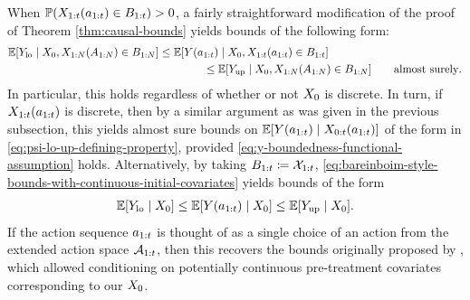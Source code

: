 





When $\mathbb{P}(X_{1:t}(a_{1:t}) \in B_{1:t}) > 0$, a fairly straightforward modification of the proof of Theorem \ref{thm:causal-bounds} yields bounds of the following form:
\begin{align}
    \mathbb{E}[Y_{\mathrm{lo}} \mid X_0, X_{1:N}(A_{1:N}) \in B_{1:N}] 
        &\leq \mathbb{E}[Y(a_{1:t}) \mid X_0, X_{1:t}(a_{1:t}) \in B_{1:t}] \notag \\
        &\qquad\qquad\leq \mathbb{E}[Y_{\mathrm{up}} \mid X_0, X_{1:N}(A_{1:N}) \in B_{1:N}] \qquad \text{almost surely}. \label{eq:bareinboim-style-bounds-with-continuous-initial-covariates}
\end{align}
In particular, this holds regardless of whether or not $X_0$ is discrete.
In turn, if $X_{1:t}(a_{1:t})$ is discrete, then by a similar argument as was given in the previous subsection, this yields almost sure bounds on $\mathbb{E}[Y(a_{1:t}) \mid X_{0:t}(a_{1:t})]$ of the form in \eqref{eq:psi-lo-up-defining-property}, provided \eqref{eq:y-boundedness-functional-assumption} holds.
Alternatively, by taking $B_{1:t} \coloneqq \mathcal{X}_{1:t}$, \eqref{eq:bareinboim-style-bounds-with-continuous-initial-covariates} yields bounds of the form
\[
    \mathbb{E}[Y_{\mathrm{lo}} \mid X_0] \leq \mathbb{E}[Y(a_{1:t}) \mid X_0] \leq \mathbb{E}[Y_{\mathrm{up}} \mid X_0].
\]
If the action sequence $a_{1:t}$ is thought of as a single choice of an action from the extended action space $\mathcal{A}_{1:t}$, then this recovers the bounds originally proposed by \citet{manski}, which allowed conditioning on potentially continuous pre-treatment covariates corresponding to our $X_0$.


